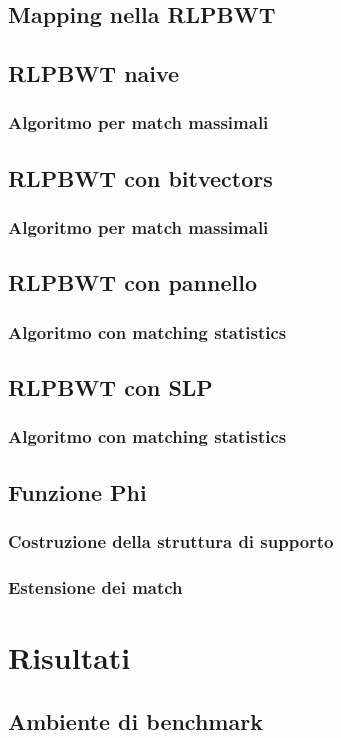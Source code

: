 \documentclass[a4paper,12pt, oneside]{book}
\begin{document}
\section{Mapping nella RLPBWT}
\section{RLPBWT naive}
\subsection{Algoritmo per match massimali}
\section{RLPBWT con bitvectors}
\subsection{Algoritmo per match massimali}
\section{RLPBWT con pannello}
\subsection{Algoritmo con matching statistics}
\section{RLPBWT con SLP}
\subsection{Algoritmo con matching statistics}
\section{Funzione Phi}
\subsection{Costruzione della struttura di supporto}
\subsection{Estensione dei match}
\chapter{Risultati}
\section{Ambiente di benchmark}
\end{document}
